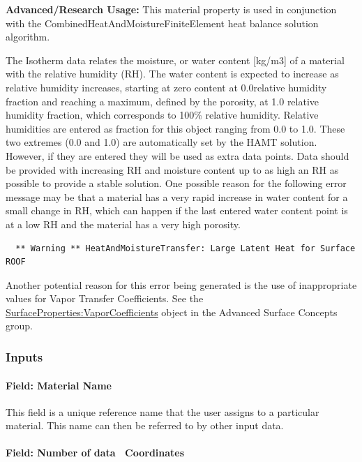 \textbf{Advanced/Research Usage:} This material property is used in conjunction with the CombinedHeatAndMoistureFiniteElement heat balance solution algorithm.

The Isotherm data relates the moisture, or water content {[}kg/m3{]} of a material with the relative humidity (RH). The water content is expected to increase as relative humidity increases, starting at zero content at 0.0relative humidity fraction and reaching a maximum, defined by the porosity, at 1.0 relative humidity fraction, which corresponds to 100\% relative humidity. Relative humidities are entered as fraction for this object ranging from 0.0 to 1.0. These two extremes (0.0 and 1.0) are automatically set by the HAMT solution. However, if they are entered they will be used as extra data points. Data should be provided with increasing RH and moisture content up to as high an RH as possible to provide a stable solution. One possible reason for the following error message may be that a material has a very rapid increase in water content for a small change in RH, which can happen if the last entered water content point is at a low RH and the material has a very high porosity.

\begin{lstlisting}
  ** Warning ** HeatAndMoistureTransfer: Large Latent Heat for Surface ROOF
\end{lstlisting}

Another potential reason for this error being generated is the use of inappropriate values for Vapor Transfer Coefficients. See the \hyperref[surfacepropertiesvaporcoefficients]{SurfaceProperties:VaporCoefficients} object in the Advanced Surface Concepts group.

\subsubsection{Inputs}\label{inputs-8-024}

\paragraph{Field: Material Name}\label{field-material-name-1}

This field is a unique reference name that the user assigns to a particular material. This name can then be referred to by other input data.

\paragraph{Field: Number of data ~Coordinates}\label{field-number-of-data-coordinates}

